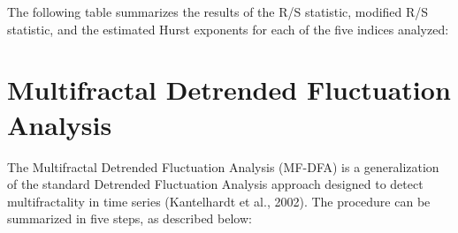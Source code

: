 \documentclass[11pt]{extarticle}
\begin{document}
\FloatBarrier


The following table summarizes the results of the R/S statistic, modified R/S statistic, and the estimated Hurst exponents for each of the five indices analyzed: \\

\begin{table}[h!]
    \centering
    \caption{Results for R/S, Hurst exponent, modified Hurst exponent, critical value at 10\%, and rejection of the null
    hypothesis of no long memory from 1987-09-10 to 2025-02-28. The Hurst exponent can be equal for the R/S and modified R/S methods in the case where
    the autocorrelation coefficients are less than zero (refer to Section~\ref{sec:long_range_dependence}), in this case we set $q$ equal to 0 and therefore the R/S and modified R/S share the same formula.
    To come back where you left off, see Section~\ref{sec:results}}
    \label{tab:Hurst_results}
\end{table}

\FloatBarrier

\section{Multifractal Detrended Fluctuation Analysis}
\label{sec:mfdfa}

The Multifractal Detrended Fluctuation Analysis (MF-DFA) is a generalization of the standard Detrended Fluctuation
Analysis approach designed to detect multifractality in time series (Kantelhardt et al., 2002). The procedure can be summarized in five steps, as described below:
\end{document}
